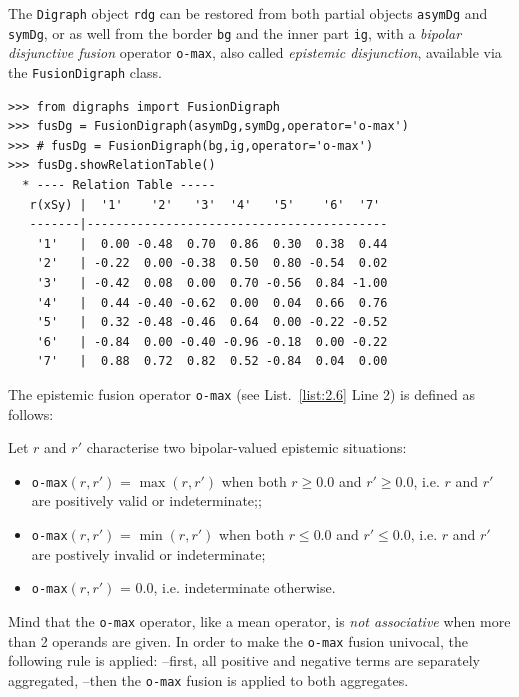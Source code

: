 The \texttt{Digraph} object \texttt{rdg} can be restored from both partial objects \texttt{asymDg} and \texttt{symDg}, or as well from the border \texttt{bg} and the inner part \texttt{ig}, with a \emph{bipolar disjunctive fusion} operator \texttt{o-max}, also called \emph{epistemic disjunction}, available via the \texttt{FusionDigraph} class. 
\begin{lstlisting}[caption={Epistemic fusion of partial diagraphs},label=list:2.6]
>>> from digraphs import FusionDigraph
>>> fusDg = FusionDigraph(asymDg,symDg,operator='o-max')
>>> # fusDg = FusionDigraph(bg,ig,operator='o-max')
>>> fusDg.showRelationTable()
  * ---- Relation Table -----
   r(xSy) |  '1'    '2'   '3'  '4'   '5'    '6'  '7'	  
   -------|------------------------------------------
    '1'   |  0.00 -0.48  0.70  0.86  0.30  0.38  0.44	 
    '2'   | -0.22  0.00 -0.38  0.50  0.80 -0.54  0.02	 
    '3'   | -0.42  0.08  0.00  0.70 -0.56  0.84 -1.00	 
    '4'   |  0.44 -0.40 -0.62  0.00  0.04  0.66  0.76	 
    '5'   |  0.32 -0.48 -0.46  0.64  0.00 -0.22 -0.52	 
    '6'   | -0.84  0.00 -0.40 -0.96 -0.18  0.00 -0.22	 
    '7'   |  0.88  0.72  0.82  0.52 -0.84  0.04  0.00
\end{lstlisting}

The epistemic fusion operator \texttt{o-max} (see List.~\vref{list:2.6} Line 2) is defined as follows:
\begin{definition}\label{def:disjunctiveFusion}

\noindent Let $r$ and $r'$ characterise two bipolar-valued epistemic situations:
\begin{itemize}[leftmargin=0.5cm,rightmargin=0.5cm,nosep]
\item \texttt{o-max}$(r, r')$ = $\max(r, r' )$ when both $r \geqslant 0.0$ and $r' \geqslant 0.0$, i.e. $r$ and $r'$ are positively valid or indeterminate;;
\item \texttt{o-max}$(r, r')$ = $\min(r, r' )$ when both $r \leqslant 0.0$ and $r' \leqslant 0.0$, i.e. $r$ and $r'$ are postively invalid or indeterminate;
\item \texttt{o-max}$(r, r')$ = $0.0$, i.e. indeterminate otherwise.
\end{itemize}
\end{definition}

Mind that the \texttt{o-max} operator, like a mean operator, is \emph{not associative} when more than 2 operands are given. In order to make the \texttt{o-max} fusion univocal, the following rule is applied: --first, all positive and negative terms are separately aggregated, --then the \texttt{o-max} fusion is applied to both aggregates.

